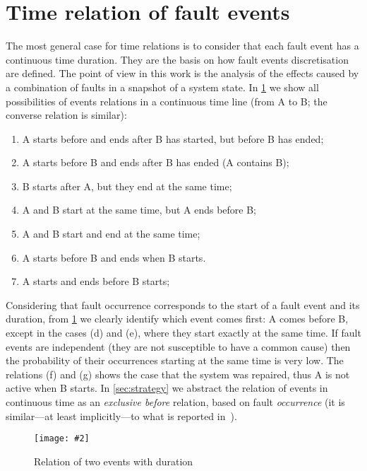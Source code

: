 \documentclass[12pt,openright,twoside,a4paper,oldfontcommands,english,brazil,final]{abntex2}
\theoremstyle{theo}
\newcommand{\includegraphicsaspectratio}[2][1]{%
  \texttt{[image: \#2]}%
}
\begin{document}
\section{Time relation of fault events}
\label{sec:time-relations}

The most general case for time relations is to consider that each fault event has a continuous time duration.
They are the basis on how fault events discretisation are defined.
The point of view in this work is the analysis of the effects caused by a combination of faults in a snapshot of a system state.
In \cref{fig:time-relations} we show all possibilities of events relations in a continuous time line (from A to B; the converse relation is similar):

\begin{enumerate}\renewcommand{\theenumi}{\alph{enumi}}
  \item A starts before and ends after B has started, but before B has ended;
  \item A starts before B and ends after B has ended (A contains B);
  \item B starts after A, but they end at the same time;
  \item A and B start at the same time, but A ends before B;
  \item A and B start and end at the same time;
  \item A starts before B and ends when B starts.
  \item A starts and ends before B starts;
\end{enumerate}

Considering that fault occurrence corresponds to the start of a fault event and its duration, from \cref{fig:time-relations} we clearly identify which event comes first: A comes before B, except in the cases (d) and (e), where they start exactly at the same time.
If fault events are independent (they are not susceptible to have a common cause) then the probability of their occurrences starting at the same time is very low.
The relations (f) and (g) shows the case that the system was repaired, thus A is not active when B starts.
In \cref{sec:strategy} we abstract the relation of events in continuous time as an \emph{exclusive before} relation, based on fault \emph{occurrence} (it is similar---at least implicitly---to what is reported in~\cite{WP2009,MRL2011}).


\begin{figure}[htb]
  \centering
  \includegraphicsaspectratio[0.5]{time-relations}
  \caption{Relation of two events with duration}
  \label{fig:time-relations}
\end{figure}
\end{document}
